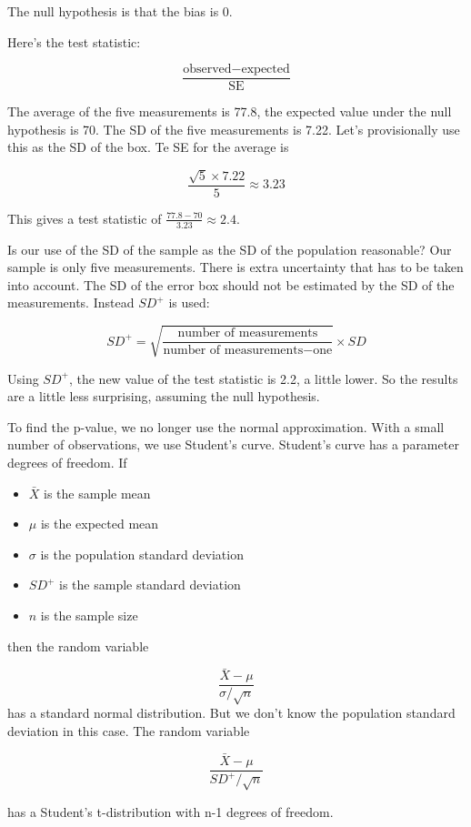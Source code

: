 \documentclass[
]{book}
\providecommand{\tightlist}{%
  \setlength{\itemsep}{0pt}\setlength{\parskip}{0pt}}
\begin{document}
The null hypothesis is that the bias is 0.

Here's the test statistic:

\[
\frac{\text{observed} - \text{expected}}{\text{SE}}
\]

The average of the five measurements is 77.8, the expected value under the null hypothesis is 70. The SD of the five measurements is 7.22. Let's provisionally use this as the SD of the box. Te SE for the average is

\[
\frac{\sqrt{5} \times 7.22}{5} \approx 3.23
\]

This gives a test statistic of \(\frac{77.8 - 70}{3.23} \approx 2.4\).

Is our use of the SD of the sample as the SD of the population reasonable? Our sample is only five measurements. There is extra uncertainty that has to be taken into account. The SD of the error box should not be estimated by the SD of the measurements. Instead \(SD^+\) is used:

\[
SD^+ = \sqrt{\frac{\text{number of measurements}}{\text{number of measurements} - \text{one}}} \times SD
\]

Using \(SD^+\), the new value of the test statistic is 2.2, a little lower. So the results are a little less surprising, assuming the null hypothesis.

To find the p-value, we no longer use the normal approximation. With a small number of observations, we use Student's curve. Student's curve has a parameter degrees of freedom. If

\begin{itemize}
\tightlist
\item
  \(\bar{X}\) is the sample mean
\item
  \(\mu\) is the expected mean
\item
  \(\sigma\) is the population standard deviation
\item
  \(SD^+\) is the sample standard deviation
\item
  \(n\) is the sample size
\end{itemize}

then the random variable

\[
\frac{\bar{X}-\mu}{\sigma / \sqrt{n}}
\]
has a standard normal distribution. But we don't know the population standard deviation in this case. The random variable

\[
\frac{\bar{X}-\mu}{SD^+ / \sqrt{n}}
\]

has a Student's t-distribution with n-1 degrees of freedom.
\end{document}
